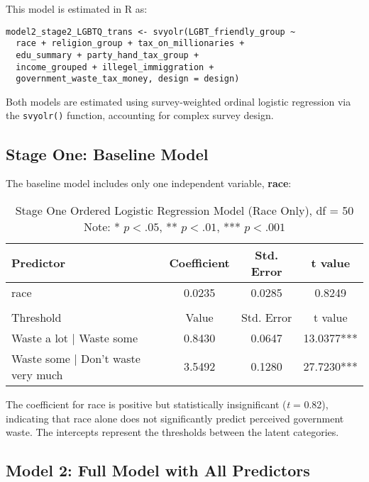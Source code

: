 \documentclass{article}
\begin{document}
This model is estimated in R as:

\begin{verbatim}
model2_stage2_LGBTQ_trans <- svyolr(LGBT_friendly_group ~ 
  race + religion_group + tax_on_millionaries + 
  edu_summary + party_hand_tax_group + 
  income_grouped + illegel_immiggration + 
  government_waste_tax_money, design = design)
\end{verbatim}

Both models are estimated using survey-weighted ordinal logistic regression via the \texttt{svyolr()} function, accounting for complex survey design.



\subsection{Stage One: Baseline Model}

The baseline model includes only one independent variable, \textbf{race}:

\begin{table}[H]
    \centering
    \caption{Stage One Ordered Logistic Regression Model (Race Only), df = 50\\
    \footnotesize Note: * $p < .05$, ** $p < .01$, *** $p < .001$}
    \begin{tabular}{lccc}
    \hline
    \textbf{Predictor} & \textbf{Coefficient} & \textbf{Std. Error} & \textbf{t value} \\
    \hline
    race & 0.0235 & 0.0285 & 0.8249 \\
    \hline
    \addlinespace[0.5em]
    \multicolumn{4}{l}{\textbf{Intercepts}} \\
    \hline
    Threshold & Value & Std. Error & t value \\
    \hline
    Waste a lot | Waste some & 0.8430 & 0.0647 & 13.0377*** \\
    Waste some | Don’t waste very much & 3.5492 & 0.1280 & 27.7230*** \\
    \hline
    \end{tabular}
\end{table}
    
    

\noindent
The coefficient for race is positive but statistically insignificant (\textit{t} = 0.82), indicating that race alone does not significantly predict perceived government waste. The intercepts represent the thresholds between the latent categories.


\subsection{Model 2: Full Model with All Predictors}
\end{document}
